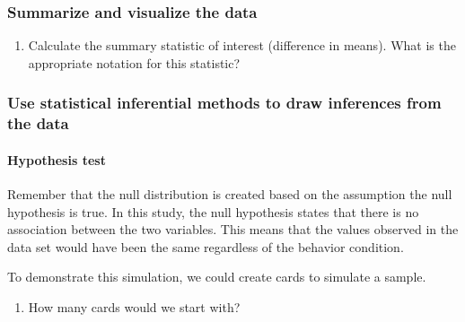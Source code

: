 \documentclass[
]{report}
\providecommand{\tightlist}{%
  \setlength{\itemsep}{0pt}\setlength{\parskip}{0pt}}
\begin{document}
\hypertarget{summarize-and-visualize-the-data-4}{%
\subsubsection*{Summarize and visualize the data}\label{summarize-and-visualize-the-data-4}}

\begin{enumerate}
\def\labelenumi{\arabic{enumi}.}
\setcounter{enumi}{8}
\tightlist
\item
  Calculate the summary statistic of interest (difference in means). What is the appropriate notation for this statistic?
\end{enumerate}

\vspace{0.5in}

\newpage

\hypertarget{use-statistical-inferential-methods-to-draw-inferences-from-the-data-3}{%
\subsubsection*{Use statistical inferential methods to draw inferences from the data}\label{use-statistical-inferential-methods-to-draw-inferences-from-the-data-3}}

\hypertarget{hypothesis-test-2}{%
\paragraph*{Hypothesis test}\label{hypothesis-test-2}}

Remember that the null distribution is created based on the assumption the null hypothesis is true. In this study, the null hypothesis states that there is no association between the two variables. This means that the values observed in the data set would have been the same regardless of the behavior condition.

To demonstrate this simulation, we could create cards to simulate a sample.

\begin{enumerate}
\def\labelenumi{\arabic{enumi}.}
\setcounter{enumi}{9}
\tightlist
\item
  How many cards would we start with?
\end{enumerate}
\end{document}
